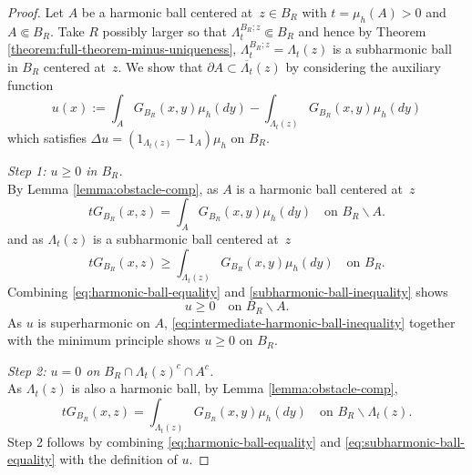 \documentclass[12pt]{amsart}
\numberwithin{equation}{section}
\newcommand{\regcluster}[2]{\hyperref[eq:regular-cluster]{\Lambda^{#1}_{#2}}}
\begin{document}
	\begin{proof}
		
		Let $A$ be a harmonic ball centered at~$z \in B_R$ with $t = \mu_h(A) > 0$ and $A \Subset B_R$. Take $R$ possibly larger so that
		${\regcluster{B_R; z}{t}} \Subset B_R$ and hence by Theorem \ref{theorem:full-theorem-minus-uniqueness},  ${\regcluster{B_R;z}{t}} = {\regcluster{}{t}}(z)$ is a subharmonic ball in $B_R$ centered at~$z$.
		We show that $\partial A \subset \overline{{\regcluster{}{t}}}(z)$ by considering the auxiliary function
		\begin{equation} \label{eq:auxiallary-function}
		u(x) := \int_{A} G_{B_R}(x,y)  \mu_h(d y) - \int_{{\regcluster{}{t}(z)}} G_{B_R}(x,y)  \mu_h(d y)
		\end{equation}
		which satisfies $\Delta u = (1_{{\regcluster{}{t}(z)}} - 1_{A}) \mu_h$ on $B_R$. 
		
		{\it Step 1: $u \geq 0$ in $B_R$.}  \\
		By Lemma \ref{lemma:obstacle-comp}, 	as $A$ is a harmonic ball centered at~$z$
		\begin{equation} \label{eq:harmonic-ball-equality}
		t G_{B_R}(x,z) = \int_{A} G_{B_R}(x,y)  \mu_h(d y) \quad \mbox{on $B_R \backslash A$}.
		\end{equation}
		and as ${\regcluster{}{t}(z)}$ is a subharmonic ball centered at~$z$
		\begin{equation} \label{subharmonic-ball-inequality}
		t G_{B_R}(x,z) \geq \int_{{\regcluster{}{t}(z)}} G_{B_R}(x,y)  \mu_h(d y) \quad \mbox{on $B_R$}.
		\end{equation}
		Combining \eqref{eq:harmonic-ball-equality} and \eqref{subharmonic-ball-inequality} shows 
		\begin{equation} \label{eq:intermediate-harmonic-ball-inequality}
		u \geq 0 \quad \mbox{on $B_R \backslash A$}.
		\end{equation}
		As $u$ is superharmonic on $A$, \eqref{eq:intermediate-harmonic-ball-inequality} together with the minimum 
		principle shows $u \geq 0$ on $B_R$.
		
		{\it Step 2: $u = 0$ on $B_R \cap {{\regcluster{}{t}(z)}}^c \cap A^c$.} \\
		As ${\regcluster{}{t}}(z)$ is also a harmonic ball, by Lemma \ref{lemma:obstacle-comp}, 
		\begin{equation} \label{eq:subharmonic-ball-equality}
		t G_{B_R}(x,z) = \int_{{\regcluster{}{t}(z)}} G_{B_R}(x,y)  \mu_h(d y) \quad \mbox{on $B_R \backslash {\regcluster{}{t}(z)}$}.
		\end{equation}
		Step 2 follows by combining \eqref{eq:harmonic-ball-equality} and \eqref{eq:subharmonic-ball-equality}
		with the definition of $u$. 
		

\end{proof}
\end{document}
